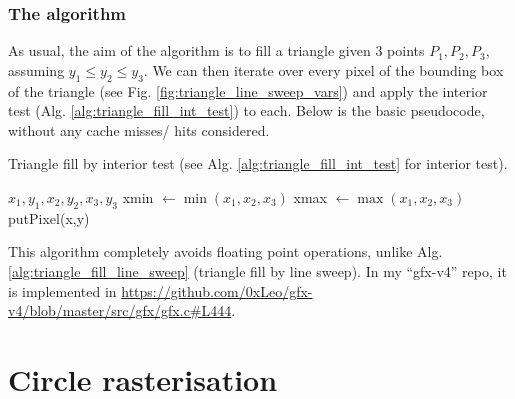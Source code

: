 \documentclass[a4paper]{article}
\begin{document}
\subsubsection{The algorithm}

As usual, the aim of the algorithm is to fill a triangle given 3 points $P_1, P_2, P_3$, assuming $y_1\leq y_2 \leq y_3$. We can then iterate over every pixel of the bounding box of the triangle (see Fig. \ref{fig:triangle_line_sweep_vars}) and apply the interior test (Alg. \ref{alg:triangle_fill_int_test}) to each. Below is the basic pseudocode, without any cache misses/ hits considered.

\begin{algorithm}[H]
\caption{Triangle fill by interior test (see Alg. \ref{alg:triangle_fill_int_test} for interior test).}
\begin{algorithmic}[1]
 {$x_1,y_1,x_2,y_2,x_3,y_3$} 
\State xmin $\leftarrow \min(x_1,x_2,x_3)$
\State xmax $\leftarrow \max(x_1,x_2,x_3)$
 putPixel(x,y)
\EndIf
\EndFor
\EndFor
\EndProcedure
\end{algorithmic}
\end{algorithm}
This algorithm completely avoids floating point operations, unlike Alg. \ref{alg:triangle_fill_line_sweep} (triangle fill by line sweep). In my ``gfx-v4'' repo, it is implemented in \url{https://github.com/0xLeo/gfx-v4/blob/master/src/gfx/gfx.c#L444}.




\clearpage
\section{Circle rasterisation}


\newpage
\printbibliography
\end{document}
